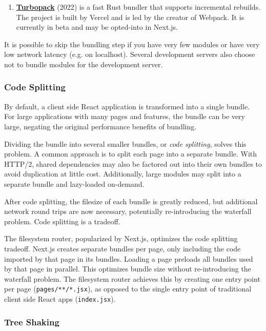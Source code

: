 \documentclass{article}
\begin{document}
\begin{enumerate}
  \item \href{https://turbo.build/pack}{\textbf{Turbopack}} (2022) is a fast Rust bundler that
    supports incremental rebuilds. The project is built by Vercel and is led by the creator of
    Webpack. It is currently in beta and may be opted-into in Next.js.
\end{enumerate}

It is possible to skip the bundling step if you have very few modules or have very low network
latency (e.g. on localhost). Several development servers also choose not to bundle modules for the
development server.

\subsubsection{Code Splitting}

By default, a client side React application is transformed into a single bundle. For large
applications with many pages and features, the bundle can be very large, negating the original
performance benefits of bundling.

Dividing the bundle into several smaller bundles, or \textit{code splitting}, solves this problem. A
common approach is to split each page into a separate bundle. With HTTP/2, shared dependencies may
also be factored out into their own bundles to avoid duplication at little cost. Additionally, large
modules may split into a separate bundle and lazy-loaded on-demand.

After code splitting, the filesize of each bundle is greatly reduced, but additional network round
trips are now necessary, potentially re-introducing the waterfall problem. Code splitting is a
tradeoff.

The filesystem router, popularized by Next.js, optimizes the code splitting tradeoff. Next.js
creates separate bundles per page, only including the code imported by that page in its bundles.
Loading a page preloads all bundles used by that page in parallel. This optimizes bundle size
without re-introducing the waterfall problem. The filesystem router achieves this by creating one
entry point per page (\texttt{pages/**/*.jsx}), as opposed to the single entry point of traditional
client side React apps (\texttt{index.jsx}).

\subsubsection{Tree Shaking}
\end{document}
